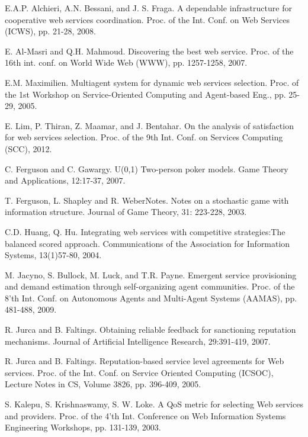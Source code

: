 \documentclass[runningheads,a4paper]{llncs}
\begin{document}
\begin{thebibliography}{1}

\small

E.A.P. Alchieri, A.N. Bessani, and J. S. Fraga.  A dependable
infrastructure for cooperative web services coordination. Proc. of
the Int. Conf. on Web Services (ICWS), pp. 21-28, 2008.


E. Al-Masri and Q.H. Mahmoud. Discovering the best web service.
Proc. of the 16th int. conf. on World Wide Web (WWW), pp.
1257-1258, 2007.

E.M. Maximilien. Multiagent system for dynamic web services
selection. Proc. of the 1st Workshop on Service-Oriented Computing
and Agent-based Eng., pp. 25-29, 2005.


E. Lim, P. Thiran, Z. Maamar, and J. Bentahar. On the analysis of
satisfaction for web services selection. Proc. of the 9th Int.
Conf. on Services Computing (SCC), 2012.

C. Ferguson and C. Gawargy. U(0,1) Two-person poker models. Game
Theory and Applications, 12:17-37, 2007.

T. Ferguson, L. Shapley and R. WeberNotes. Notes on a stochastic
game with information structure. Journal of Game Theory, 31:
223-228, 2003.

C.D. Huang, Q. Hu.  Integrating web services with competitive
strategies:The balanced scored approach. Communications of the
Association for Information Systems, 13(1)57-80, 2004.


M. Jacyno, S. Bullock, M. Luck, and T.R. Payne. Emergent service
provisioning and demand estimation through self-organizing agent
communities. Proc. of the 8'th Int. Conf. on Autonomous Agents and
Multi-Agent Systems (AAMAS), pp. 481-488, 2009.


R. Jurca and B. Faltings. Obtaining reliable feedback for
sanctioning reputation mechanisms. Journal of Artificial
Intelligence Research, 29:391-419, 2007.


R. Jurca and B. Faltings. Reputation-based service level
agreements for Web services. Proc. of the Int. Conf. on Service
Oriented Computing (ICSOC), Lecture Notes in CS, Volume 3826, pp.
396-409, 2005.


S. Kalepu, S. Krishnaswamy, S. W. Loke. A QoS metric for selecting
Web services and providers. Proc. of the 4'th Int. Conference on
Web Information Systems Engineering Workshops, pp. 131-139, 2003.


\end{thebibliography}
\end{document}
